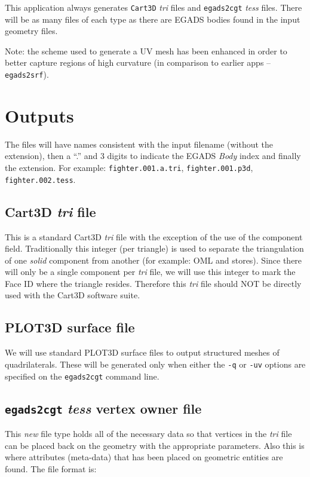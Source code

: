 \documentclass[titlepage]{article}
\begin{document}
This application always generates {\tt Cart3D} {\it tri} files and {\tt egads2cgt} {\it tess} files.
There will be as many files of each type as there are EGADS bodies found in the input
geometry files.

\vspace{0.1in}
\noindent
Note: the scheme used to generate a UV mesh has been enhanced in order to better capture
regions of high curvature (in comparison to earlier apps -- {\tt egads2srf}).

\section{Outputs}

The files will have names consistent with the input filename (without the extension), then a ``.'' and 3 digits
to indicate the EGADS {\it Body} index and finally the extension. For example: {\tt fighter.001.a.tri}, {\tt fighter.001.p3d},
{\tt fighter.002.tess}.

\subsection{Cart3D {\it tri} file}

This is a standard Cart3D {\it tri} file with the exception of the use of the component field. Traditionally
this integer (per triangle) is used to separate the triangulation of one {\it solid} component from another (for
example: OML and stores). Since there will only be a single component per {\it tri} file, we will use this integer
to mark the Face ID where the triangle resides. Therefore this {\it tri} file should NOT be directly used with the Cart3D
software suite.

\subsection{PLOT3D surface file}

We will use standard PLOT3D surface files to output structured meshes of quadrilaterals. These will be generated
only when either the {\tt -q} or {\tt -uv} options are specified on the {\tt egads2cgt} command line.

\subsection{{\tt egads2cgt} {\it tess} vertex owner file}

This {\it new} file type holds all of the necessary data so that vertices in the {\it tri} file can be placed back on the
geometry with the appropriate parameters. Also this is where attributes (meta-data) that has been placed on geometric
entities are found. The file format is:
\end{document}
